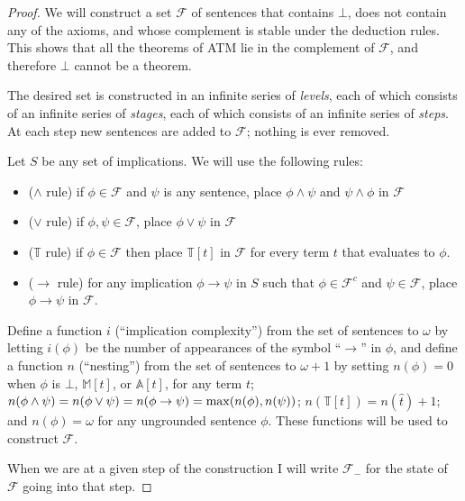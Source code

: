 \documentclass{amsart}
\theoremstyle{definition}
\begin{document}
\begin{proof}
  We will construct a set $\mathcal{F}$ of sentences that contains $\bot$, does not contain any of the axioms, and
  whose complement is stable under the deduction rules. This shows that all the theorems of ATM lie
  in the complement of $\mathcal{F}$, and therefore $\bot$ cannot be a theorem.

  The desired set is constructed in an infinite series of {\it levels}, each of
  which consists of an infinite series of {\it stages}, each of which consists of an infinite series of {\it steps}.
  At each step new sentences are added to $\mathcal{F}$; nothing is ever removed.

  Let $S$ be any set of implications. We will use the following rules:

  \begin{itemize}
  \item ($\wedge$ rule) if $\phi \in \mathcal{F}$ and $\psi$ is any sentence, place $\phi \wedge \psi$
    and $\psi \wedge \phi$ in $\mathcal{F}$

  \item ($\vee$ rule) if $\phi, \psi \in \mathcal{F}$, place $\phi \vee \psi$ in $\mathcal{F}$

  \item ($\mathbb{T}$ rule) if $\phi \in \mathcal{F}$ then place $\mathbb{T}[t]$ in $\mathcal{F}$ for every
    term $t$ that evaluates to $\phi$.

  \item ($\to$ rule) for any implication $\phi \to \psi$ in $S$ such that  $\phi \in \mathcal{F}^c$ and
    $\psi \in \mathcal{F}$, place $\phi \to \psi$ in $\mathcal{F}$.
  \end{itemize}

  Define a function $i$ (``implication complexity'') from the set of sentences to $\omega$ by letting $i(\phi)$ be the
  number of appearances of the symbol ``$\to$'' in $\phi$, and define a function $n$ (``nesting'') from the set of
  sentences to $\omega + 1$ by setting $n(\phi) = 0$ when $\phi$ is $\bot$, $\mathbb{M}[t]$, or $\mathbb{A}[t]$, for any
  term $t$; $n(\phi \wedge \psi) = n(\phi \vee \psi) = n(\phi \to \psi) = {\rm max}(n(\phi), n(\psi))$;
  $n(\mathbb{T}[t]) = n(\hat{t}) + 1$; and $n(\phi) = \omega$ for any ungrounded sentence $\phi$.
  These functions will be used to construct $\mathcal{F}$.

  When we are at a given step of the construction I will write $\mathcal{F}_-$ for the state of $\mathcal{F}$ going
  into that step.


\end{proof}
\end{document}
